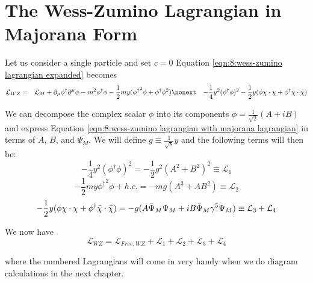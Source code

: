 \section{The Wess-Zumino Lagrangian in Majorana Form}
\label{ch:8:wess-zumino lagrangian in majorana form}
Let us consider a single particle and set $c = 0$ Equation \ref{eqn:8:wess-zumino lagrangian expanded} becomes 
\begin{eqnarray}
    \mathcal{L}_{WZ} &=& \mathcal{L}_M + \partial_\mu \phi^\dagger \partial^\mu \phi - m^2 \phi^\dagger \phi - \frac{1}{2}my({\phi^\dagger}^2\phi + \phi^\dagger\phi^2) \nonext 
    &&- \frac{1}{4}y^2(\phi^\dagger\phi)^2 - \frac{1}{2}y(\phi\chi\cdot\chi + \phi^\dagger\Bar{\chi}\cdot\Bar{\chi})
    \label{eqn:8:wess-zumino lagrangian with majorana lagrangian}
\end{eqnarray}

We can decompose the complex scalar $\phi$ into its components $\phi = \frac{1}{\sqrt{2}}(A + i B)$ and express Equation \ref{eqn:8:wess-zumino lagrangian with majorana lagrangian} in terms of $A$, $B$, and $\Psi_M$. We will define $g \equiv \frac{1}{\sqrt{8}}y$ and the following terms will then be:
\begin{equation}
    -\frac{1}{4}y^2(\phi^\dagger \phi)^2 = -\frac{1}{2} g^2 (A^2 + B^2)^2 \equiv \mathcal{L}_1
    \label{eqn:8:L1}
\end{equation}
\begin{equation}
    -\frac{1}{2}my{\phi^\dagger}^2\phi + h.c. = - mg (A^3 + AB^2) \equiv \mathcal{L}_2
    \label{eqn:8:L2}
\end{equation}
\begin{equation}
    -\frac{1}{2}y(\phi\chi\cdot\chi + \phi^\dagger \Bar{\chi}\cdot\Bar{\chi}) = -g(A\Bar{\Psi}_M\Psi_M + iB\Bar{\Psi}_M\gamma^5\Psi_M) \equiv \mathcal{L}_3 + \mathcal{L}_4
\end{equation}

We now have
\begin{equation}
    \mathcal{L}_{WZ} = \mathcal{L}_{Free, WZ} + \mathcal{L}_1 + \mathcal{L}_2 + \mathcal{L}_3 + \mathcal{L}_4
\end{equation}

where the numbered Lagrangians will come in very handy when we do diagram calculations in the next chapter.